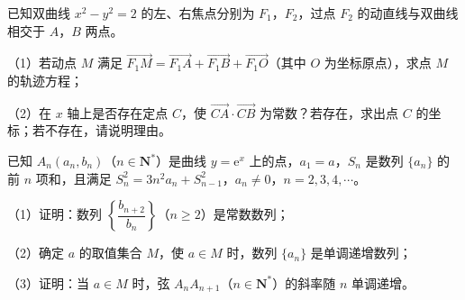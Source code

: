 \begin{question}
已知双曲线 $x^2-y^2=2$ 的左、右焦点分别为 $F_1$，$F_2$，过点 $F_2$ 的动直线与双曲线相交于 $A$，$B$ 两点。

（1）若动点 $M$ 满足 $\overrightarrow{F_1M}=\overrightarrow{F_1A}+\overrightarrow{F_1B}+\overrightarrow{F_1O}$（其中 $O$ 为坐标原点），求点 $M$ 的轨迹方程；

（2）在 $x$ 轴上是否存在定点 $C$，使 $\overrightarrow{CA}\cdot\overrightarrow{CB}$ 为常数？若存在，求出点 $C$ 的坐标；若不存在，请说明理由。

\end{question}
\begin{question}
已知 $A_n(a_n,b_n)$（$n\in\mathbf N^*$）是曲线 $y=\mathrm e^x$ 上的点，$a_1=a$，$S_n$ 是数列 $\{a_n\}$ 的前 $n$ 项和，且满足 $S_n^2=3n^2a_n+S_{n-1}^2$，$a_n\neq0$，$n=2,3,4,\cdots$。

（1）证明：数列 $\left\{\dfrac{b_{n+2}}{b_n}\right\}$（$n\geqslant2$）是常数数列；

（2）确定 $a$ 的取值集合 $M$，使 $a\in M$ 时，数列 $\{a_n\}$ 是单调递增数列；

（3）证明：当 $a\in M$ 时，弦 $A_nA_{n+1}$（$n\in\mathbf N^*$）的斜率随 $n$ 单调递增。

\end{question}